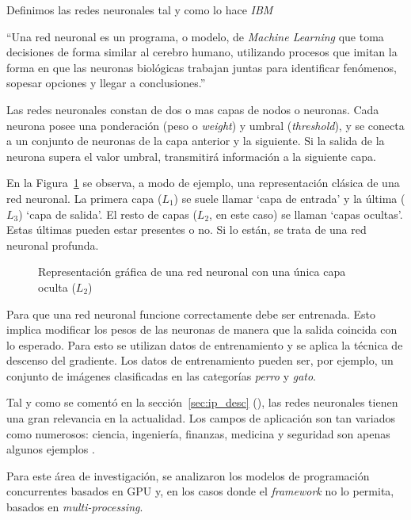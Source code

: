 \documentclass[11pt]{article}
\newcommand{\english}[1]{\textit{#1}}
\newcommand{\technical}[1]{\textit{#1}}
\begin{document}
Definimos las redes neuronales tal y como lo hace \english{IBM} \cite{nn:definition}

\begin{displayquote}
``Una red neuronal es un programa, o modelo, de \english{Machine Learning} que toma decisiones de forma similar al cerebro humano, utilizando procesos que imitan la forma en que las neuronas biológicas trabajan juntas para identificar fenómenos, sopesar opciones y llegar a conclusiones.''
\end{displayquote}

Las redes neuronales constan de dos o mas capas de nodos o neuronas. Cada neurona posee una ponderación (peso o \english{weight}) y umbral (\english{threshold}), y se conecta a un conjunto de neuronas de la capa anterior y la siguiente. Si la salida de la neurona supera el valor umbral, transmitirá información a la siguiente capa.

En la Figura~\ref{fig:nn:diagram} se observa, a modo de ejemplo, una representación clásica de una red neuronal. La primera capa ($L_1$) se suele llamar `capa de entrada' y la última ($L_3$) `capa de salida'. El resto de capas ($L_2$, en este caso) se llaman `capas ocultas'. Estas últimas pueden estar presentes o no. Si lo están, se trata de una red neuronal profunda.

 \begin{figure}[h]
    \centering
    
    \caption{Representación gráfica de una red neuronal con una única capa oculta ($L_2$)}
    \label{fig:nn:diagram}
\end{figure}

Para que una red neuronal funcione correctamente debe ser entrenada. Esto implica modificar los pesos de las neuronas de manera que la salida coincida con lo esperado. Para esto se utilizan datos de entrenamiento y se aplica la técnica de descenso del gradiente. Los datos de entrenamiento pueden ser, por ejemplo, un conjunto de imágenes clasificadas en las categorías \technical{perro} y \technical{gato}.

Tal y como se comentó en la sección~\ref{sec:ip_desc} (), las redes neuronales tienen una gran relevancia en la actualidad. Los campos de aplicación son tan variados como numerosos: ciencia, ingeniería, finanzas, medicina y seguridad son apenas algunos ejemplos \cite{nn:survey}.

Para este área de investigación, se analizaron los modelos de programación concurrentes basados en GPU y, en los casos donde el \english{framework} no lo permita, basados en \english{multi-processing}. 
\end{document}
